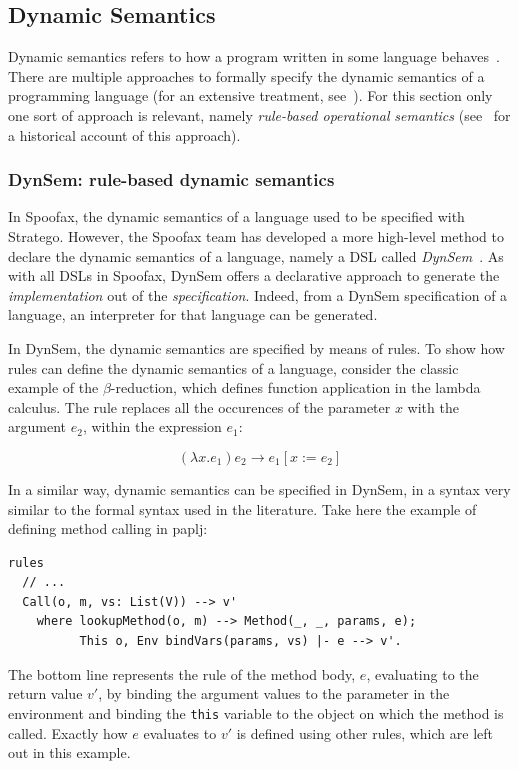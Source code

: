 \subsection{Dynamic Semantics}
\label{sec:dynamic-semantics}
Dynamic semantics refers to how a program written in some language
behaves~\cite{Winskel93}. There are multiple approaches to
formally specify the dynamic semantics of a programming language (for
an extensive treatment, see~\cite{Winskel93}). For this section
only one sort of approach is relevant, namely \emph{rule-based operational}
\emph{semantics} (see~\cite{Plotkin04} for a historical account of this
approach).

\subsubsection{DynSem: rule-based dynamic semantics}
\label{ssec:dynsem}
In Spoofax, the dynamic semantics of a language used to be specified
with Stratego. However, the Spoofax team has developed a more
high-level method to declare the dynamic semantics of a language,
namely a DSL called \emph{DynSem}~\cite{VerguNV15}. As with all DSLs in
Spoofax, DynSem offers a declarative approach to generate the
\emph{implementation} out of the \emph{specification}. Indeed, from a DynSem
specification of a language, an interpreter for that language can be
generated.

In DynSem, the dynamic semantics are specified by means of rules. To
show how rules can define the dynamic semantics of a language,
consider the classic example of the \(\beta\)-reduction, which defines
function application in the lambda calculus. The rule replaces all the
occurences of the parameter \(x\) with the argument \(e_2\), within the
expression \(e_1\):

\begin{equation}
(\lambda x.e_1) e_2 \rightarrow e_1[x := e_2]
\end{equation}

In a similar way, dynamic semantics can be specified in DynSem, in a
syntax very similar to the formal syntax used in the literature. Take
here the example of defining method calling in paplj:
\lstset{language=dynsem,numbers=left}
\begin{lstlisting}
rules
  // ...
  Call(o, m, vs: List(V)) --> v'
    where lookupMethod(o, m) --> Method(_, _, params, e);
          This o, Env bindVars(params, vs) |- e --> v'.
\end{lstlisting}
The bottom line represents the rule of the method body, \(e\),
evaluating to the return value \(v'\), by binding the argument values to
the parameter in the environment and binding the \texttt{this} variable to
the object on which the method is called. Exactly how \(e\) evaluates to
\(v'\) is defined using other rules, which are left out in this example.
\lstset{numbers=none}

